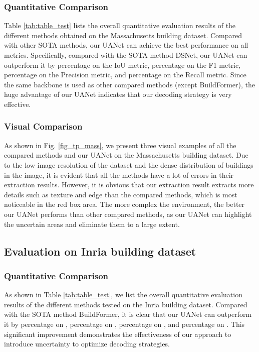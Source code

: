 \documentclass[lettersize,journal]{IEEEtran}
\begin{document}
\subsubsection{Quantitative Comparison}
Table \ref{tab:table_test} lists the overall quantitative evaluation results of the different methods obtained on the Massachusetts building dataset. Compared with other SOTA methods, our UANet can achieve the best performance on all metrics. Specifically, compared with the SOTA method DSNet, our UANet can outperform it by  percentage on the IoU metric,  percentage on the F1 metric,  percentage on the Precision metric, and  percentage on the Recall metric. Since the same backbone is used as other compared methods (except BuildFormer), the huge advantage of our UANet indicates that our decoding strategy is very effective.

\subsubsection{Visual Comparison}
As shown in Fig. \ref{fig_tp_mass}, we present three visual examples of all the compared methods and our UANet on the Massachusetts building dataset. Due to the low image resolution of the dataset and the dense distribution of buildings in the image, it is evident that all the methods have a lot of errors in their extraction results. However, it is obvious that our extraction result extracts more details such as texture and edge than the compared methods, which is most noticeable in the red box area. The more complex the environment, the better our UANet performs than other compared methods, as our UANet can highlight the uncertain areas and eliminate them to a large extent.


\subsection{Evaluation on Inria building dataset}
\subsubsection{Quantitative Comparison}
As shown in Table \ref{tab:table_test}, we list the overall quantitative evaluation results of the different methods tested on the Inria building dataset. Compared with the SOTA method BuildFormer, it is clear that our UANet can outperform it by  percentage on ,  percentage on ,  percentage on , and  percentage on . This significant improvement demonstrates the effectiveness of our approach to introduce uncertainty to optimize decoding strategies.
\end{document}
